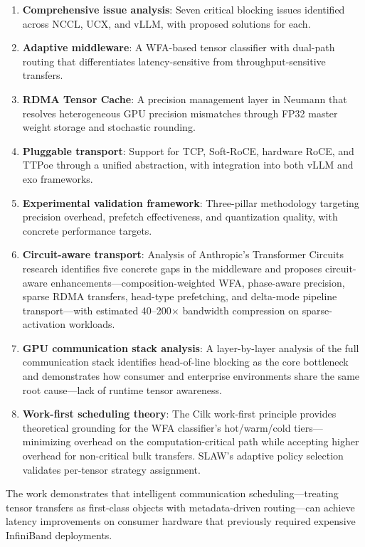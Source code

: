\documentclass[11pt,letterpaper]{article}
\theoremstyle{definition}
\begin{document}
\begin{enumerate}
    \item \textbf{Comprehensive issue analysis}: Seven critical blocking issues identified across NCCL, UCX, and vLLM, with proposed solutions for each.
    \item \textbf{Adaptive middleware}: A WFA-based tensor classifier with dual-path routing that differentiates latency-sensitive from throughput-sensitive transfers.
    \item \textbf{RDMA Tensor Cache}: A precision management layer in Neumann that resolves heterogeneous GPU precision mismatches through FP32 master weight storage and stochastic rounding.
    \item \textbf{Pluggable transport}: Support for TCP, Soft-RoCE, hardware RoCE, and TTPoe through a unified abstraction, with integration into both vLLM and exo frameworks.
    \item \textbf{Experimental validation framework}: Three-pillar methodology targeting precision overhead, prefetch effectiveness, and quantization quality, with concrete performance targets.
    \item \textbf{Circuit-aware transport}: Analysis of Anthropic's Transformer Circuits research identifies five concrete gaps in the middleware and proposes circuit-aware enhancements---composition-weighted WFA, phase-aware precision, sparse RDMA transfers, head-type prefetching, and delta-mode pipeline transport---with estimated 40--200$\times$ bandwidth compression on sparse-activation workloads.
    \item \textbf{GPU communication stack analysis}: A layer-by-layer analysis of the full communication stack identifies head-of-line blocking as the core bottleneck and demonstrates how consumer and enterprise environments share the same root cause---lack of runtime tensor awareness.
    \item \textbf{Work-first scheduling theory}: The Cilk work-first principle provides theoretical grounding for the WFA classifier's hot/warm/cold tiers---minimizing overhead on the computation-critical path while accepting higher overhead for non-critical bulk transfers. SLAW's adaptive policy selection validates per-tensor strategy assignment.
\end{enumerate}

The work demonstrates that intelligent communication scheduling---treating tensor transfers as first-class objects with metadata-driven routing---can achieve latency improvements on consumer hardware that previously required expensive InfiniBand deployments.
\end{document}
